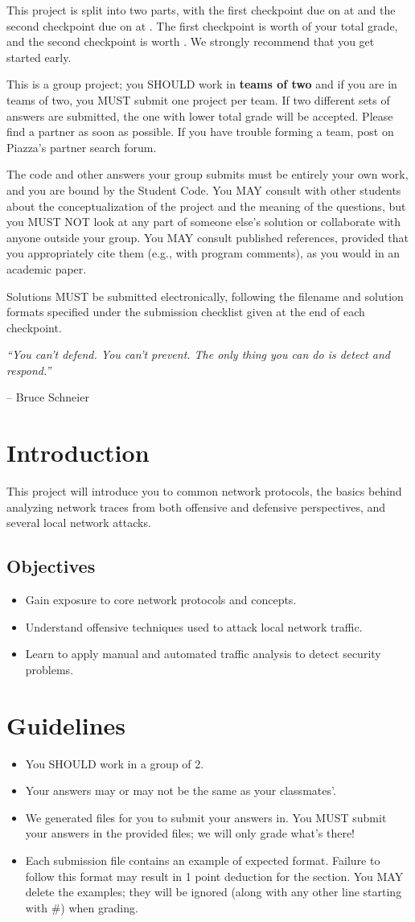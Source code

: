 \documentclass[letterpaper,12pt]{report}
\newcommand{\htitle}
{
     \noindent\parbox{\textwidth}
    {
        \course\hfill \distdate\newline
        \coursename\hfill 
        \settitle \vspace*{-.5ex}\newline
        \mbox{}\hrulefill\mbox{}
    }
    \vspace{8pt}
    \begin{center}{\Large\bf{\settitle}}\end{center}
}
\newcommand{\handout}
{
    \thispagestyle{empty}
    \markboth{}{}
    \pagestyle{plain}
    \htitle
}
\newcommand{\problemsetheader}
{
\setlength{\parindent}{0pt}

\medskip

This project is split into two parts, with the first checkpoint due on {\bf \checkpointduedate} at {\bf \duetime} and the second checkpoint due on {\bf \duedate} at {\bf \duetime}.
The first checkpoint is worth {\firstcheckpointpercent} of your total grade, and the second checkpoint is worth \secondcheckpointpercent.
We strongly recommend that you get started early.

\medskip

This is a group project; you SHOULD work in \textbf{teams of two} and if you are in teams of two, you MUST submit one project per team.
If two different sets of answers are submitted, the one with lower total grade will be accepted.
Please find a partner as soon as possible.
If you have trouble forming a team, post on Piazza's partner search forum.

\medskip

The code and other answers your group submits must be entirely your own work, and you are bound by the Student Code.
You MAY consult with other students about the conceptualization of the project and the meaning of the questions, but you MUST NOT look at any part of someone else's solution or collaborate with anyone outside your group.
You MAY consult published references, provided that you appropriately cite them (e.g., with program comments), as you would in an academic paper.

\medskip

Solutions MUST be submitted electronically, following the filename and solution formats specified under the submission checklist given at the end of each checkpoint.

\medskip

\hrulefill

\medskip
}
\begin{document}
\handout
\problemsetheader
\medskip
\noindent
\emph{``You can't defend. You can't prevent. The only thing you can do is detect and respond.''}

\begingroup\raggedleft
-- Bruce Schneier\\
\endgroup

\newpage

\section*{Introduction}

This project will introduce you to common network protocols, the basics behind analyzing network traces from both offensive and defensive perspectives, and several local network attacks.

\vspace{-6pt}
\subsection*{Objectives}
\begin{itemize}
\item Gain exposure to core network protocols and concepts.
\item Understand offensive techniques used to attack local network traffic.
\item Learn to apply manual and automated traffic analysis to detect security problems.
\end{itemize}

\section*{Guidelines}
\begin{itemize}
\item You SHOULD work in a group of 2.
\item Your answers may or may not be the same as your classmates'.
\item We generated files for you to submit your answers in.
You MUST submit your answers in the provided files; we will only grade what's there!
\item Each submission file contains an example of expected format. Failure to follow this format may result in 1 point deduction for the section. You MAY delete the examples; they will be ignored (along with any other line starting with \#) when grading.
\end{itemize}
\end{document}
